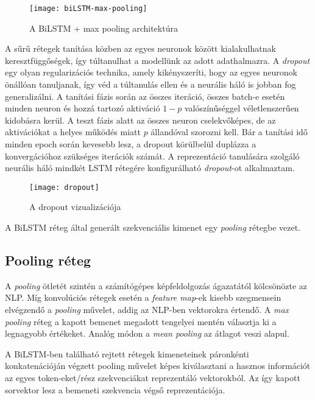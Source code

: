 \begin{figure}[H]
	\centering
	\texttt{[image: biLSTM-max-pooling]}
	\caption{A BiLSTM + max pooling architektúra}
\end{figure}

A sűrű rétegek tanítása közben az egyes neuronok között kialakulhatnak keresztfüggőségek, így túltanulhat a modellünk az adott adathalmazra. A \textit{dropout} egy olyan regularizációs technika, amely kikényszeríti, hogy az egyes neuronok önállóan tanuljanak, így véd a túltanulás ellen és a neurális háló is jobban fog generalizálni. A tanítási fázis során az összes iteráció, összes batch-e esetén minden neuron és hozzá tartozó aktiváció $1-p$ valószínűséggel véletlenszerűen kidobásra kerül. A teszt fázis alatt az összes neuron cselekvőképes, de az aktivációkat a helyes működés miatt $p$ állandóval szorozni kell. Bár a tanítási idő minden epoch során kevesebb lesz, a dropout körülbelül duplázza a konvergációhoz szükséges iterációk számát. A reprezentáció tanulására szolgáló neurális háló mindkét LSTM rétegére konfigurálható \textit{dropout}-ot alkalmaztam.

\begin{figure}[H]
	\centering
	\texttt{[image: dropout]}
	\caption{A dropout vizualizációja \cite{dropout}}
\end{figure}

A BiLSTM réteg által generált szekvenciális kimenet egy \textit{pooling} rétegbe vezet.

\subsection{Pooling réteg}

A \textit{pooling} ötletét szintén a számítógépes képfeldolgozás ágazatától kölcsönözte az NLP. Míg konvolúciós rétegek esetén a \textit{feature map}-ek kisebb szegmensein elvégzendő a \textit{pooling} művelet, addig az NLP-ben vektorokra értendő.
A \textit{max pooling} réteg a kapott bemenet megadott tengelyei mentén választja ki a legnagyobb értékeket. Analóg módon a \textit{mean pooling} az átlagot veszi alapul.

A BiLSTM-ben található rejtett rétegek kimeneteinek páronkénti konkatenációján végzett pooling művelet képes kiválasztani a hasznos információt az egyes token-eket/rész szekvenciákat reprezentáló vektorokból. Az így kapott sorvektor lesz a bemeneti szekvencia végső reprezentációja.

